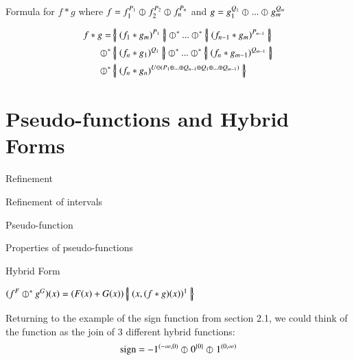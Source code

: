 Formula for $f*g$ where $f = f_1^{P_1} \hjoin f_2^{P_2} \hjoin f_n^{P_n}$ and $g = g_1^{Q_1} \hjoin ... \hjoin g_m^{Q_m}$

\begin{align*}
f*g = & \hset{ (f_1 * g_m)^{P_1} } \hjoin[*] ... \hjoin[*] \hset{ (f_{n-1} * g_m)^{P_{n-1}}} \\ \hjoin[*]
& \hset{ (f_n * g_1)^{Q_1} } \hjoin[*] ... \hjoin[*] \hset{ (f_n * g_{m-1})^{Q_{m-1}}} \\ \hjoin[*]
&\hset{ (f_n * g_n)^{U \ominus (P_1 \oplus ... \oplus Q_{n-1} \oplus Q_1 \oplus ... \oplus Q_{m-1})}}
\end{align*}




\newpage \addtocounter{page}{1}














\section{Pseudo-functions and Hybrid Forms}
\begin{definition}
Refinement
\end{definition}

\begin{example}
Refinement of intervals
\end{example}

\begin{definition}
Pseudo-function
\end{definition}

Properties of pseudo-functions

\begin{definition}
Hybrid Form
\end{definition}

\begin{definition}
$(f^F \hjoin[*] g^G)(x) = (F(x) + G(x)) \hset{(x, (f*g)(x))^1}$
\end{definition}

Returning to the example of the sign function from section 2.1, we could think of the function as the join of 3 different hybrid functions:
\begin{equation}
\text{sign} = -1^{(-\infty, 0)} \hjoin 0^{\{0\}} \hjoin 1^{(0, \infty)}
\end{equation}

